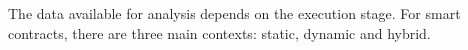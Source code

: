 The data available for analysis depends on the execution stage.
For smart contracts, there are three main contexts: static, dynamic and hybrid.
